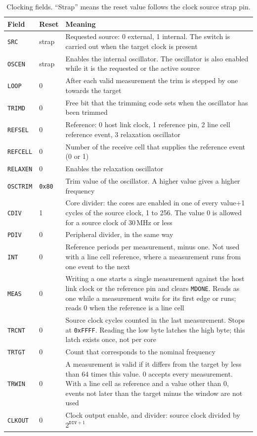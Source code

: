 \documentclass[10pt,a4paper]{article}
\newcommand{\reg}[1]{\texttt{#1}}
\begin{document}
\begin{table}[H]
\centering\small
\begin{tabularx}{\linewidth}{@{}llL@{}}
\toprule
Field & Reset & Meaning \\
\midrule
\reg{SRC} & strap & Requested source: 0 external, 1 internal. The switch is carried out when the target clock is present \\
\reg{OSCEN} & strap & Enables the internal oscillator. The oscillator is also enabled while it is the requested or the active source \\
\reg{LOOP} & 0 & After each valid measurement the trim is stepped by one towards the target \\
\reg{TRIMD} & 0 & Free bit that the trimming code sets when the oscillator has been trimmed \\
\reg{REFSEL} & 0 & Reference: 0 host link clock, 1 reference pin, 2 line cell reference event, 3 relaxation oscillator \\
\reg{REFCELL} & 0 & Number of the receive cell that supplies the reference event (0 or 1) \\
\reg{RELAXEN} & 0 & Enables the relaxation oscillator \\
\reg{OSCTRIM} & \texttt{0x80} & Trim value of the oscillator. A higher value gives a higher frequency \\
\reg{CDIV} & 1 & Core divider: the cores are enabled in one of every value+1 cycles of the source clock, 1 to 256. The value 0 is allowed for a source clock of 30\,MHz or less \\
\reg{PDIV} & 0 & Peripheral divider, in the same way \\
\reg{INT} & 0 & Reference periods per measurement, minus one. Not used with a line cell reference, where a measurement runs from one event to the next \\
\reg{MEAS} & 0 & Writing a one starts a single measurement against the host link clock or the reference pin and clears \reg{MDONE}. Reads as one while a measurement waits for its first edge or runs; reads 0 when the reference is a line cell \\
\reg{TRCNT} & 0 & Source clock cycles counted in the last measurement. Stops at \texttt{0xFFFF}. Reading the low byte latches the high byte; this latch exists once, not per core \\
\reg{TRTGT} & 0 & Count that corresponds to the nominal frequency \\
\reg{TRWIN} & 0 & A measurement is valid if it differs from the target by less than 64 times this value. 0 accepts every measurement. With a line cell as reference and a value other than 0, events not later than the target minus the window are not used \\
\reg{CLKOUT} & 0 & Clock output enable, and divider: source clock divided by $2^{\mathtt{DIV}+1}$ \\
\bottomrule
\end{tabularx}
\caption{Clocking fields. ``Strap'' means the reset value follows the clock source strap pin.}
\end{table}
\end{document}
